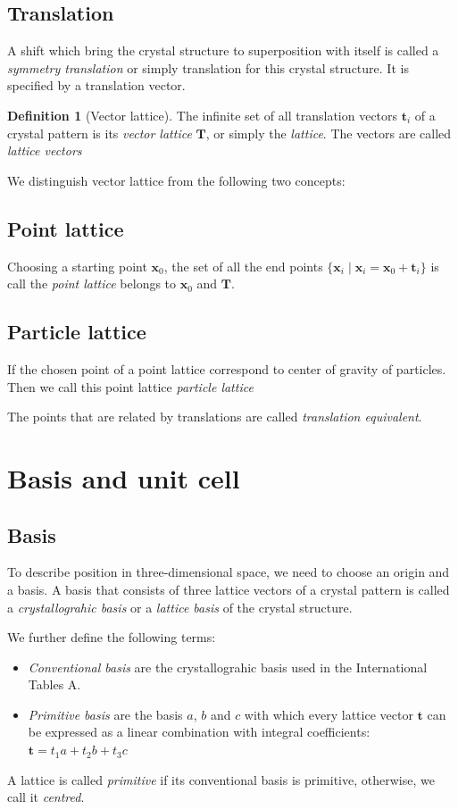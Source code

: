 \documentclass{amsart}
\newcommand{\bfx}{\mathbf{x}}
\newcommand{\bft}{\mathbf{t}}
\theoremstyle{remark}
\theoremstyle{remark}
\theoremstyle{definition}
\newtheorem*{definition}{Definition}
\begin{document}
\subsection*{Translation}
A shift which bring the crystal structure to superposition with itself is called 
a \emph{symmetry translation} or simply translation for this crystal structure. 
It is specified by a translation vector.

\begin{definition}
    [Vector lattice]
    The infinite set of all translation vectors $\bft_i$ of a crystal pattern is its \emph{vector lattice} $\mathbf{T}$, 
    or simply the \emph{lattice}. 
    The vectors are called \emph{lattice vectors}
\end{definition}
We distinguish vector lattice from the following two concepts:

\subsection*{Point lattice}
Choosing a starting point $\bfx_0$, the set of all the end points $\{\bfx_i\mid\bfx_i = \bfx_0 + \bft_i\}$
is call the \emph{point lattice} belongs to $\bfx_0$ and $\mathbf{T}$.
\subsection*{Particle lattice}
If the chosen point of a point lattice correspond to center of gravity of particles. Then we call this point lattice \emph{particle lattice}

The points that are related by translations are called \emph{translation equivalent}.

\vspace{10pt}
\section*{Basis and unit cell}

\subsection*{Basis}
To describe position in three-dimensional space, we need to choose an origin and a basis. 
A basis that consists of three lattice vectors of a crystal pattern is called a \emph{crystallograhic basis}
or a \emph{lattice basis} of the crystal structure. 

We further define the following terms:
\begin{itemize}
    \item \emph{Conventional basis} are the crystallograhic basis used in the International Tables A.
    \item \emph{Primitive basis} are the basis $a$, $b$ and $c$ with which every lattice vector $\bft$ can be expressed 
            as a linear combination with integral coefficients: $\bft = t_1 a + t_2 b + t_3 c$
\end{itemize}
A lattice is called \emph{primitive} if its conventional basis is primitive,  otherwise, we call it \emph{centred}. 
\end{document}
